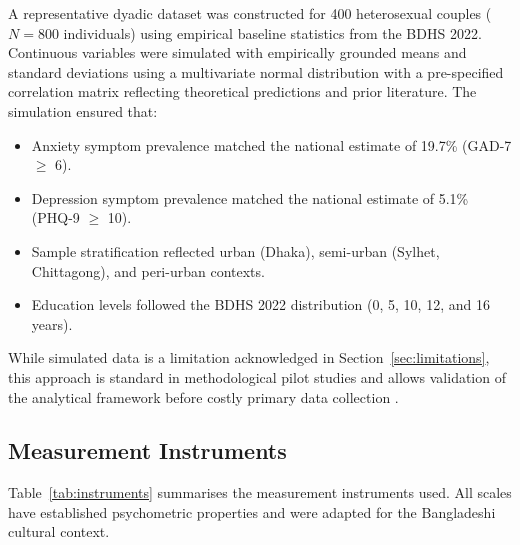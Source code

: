 \documentclass[12pt, a4paper]{article}
\begin{document}
A representative dyadic dataset was constructed for 400 heterosexual couples ($N = 800$ individuals) using empirical baseline statistics from the BDHS 2022. Continuous variables were simulated with empirically grounded means and standard deviations using a multivariate normal distribution with a pre-specified correlation matrix reflecting theoretical predictions and prior literature. The simulation ensured that:

\begin{itemize}[leftmargin=2em]
  \item Anxiety symptom prevalence matched the national estimate of 19.7\% (GAD-7 $\geq$ 6).
  \item Depression symptom prevalence matched the national estimate of 5.1\% (PHQ-9 $\geq$ 10).
  \item Sample stratification reflected urban (Dhaka), semi-urban (Sylhet, Chittagong), and peri-urban contexts.
  \item Education levels followed the BDHS 2022 distribution (0, 5, 10, 12, and 16 years).
\end{itemize}

While simulated data is a limitation acknowledged in Section~\ref{sec:limitations}, this approach is standard in methodological pilot studies and allows validation of the analytical framework before costly primary data collection \citep{creswell2017}.

\subsection{Measurement Instruments}

Table~\ref{tab:instruments} summarises the measurement instruments used. All scales have established psychometric properties and were adapted for the Bangladeshi cultural context.
\end{document}
